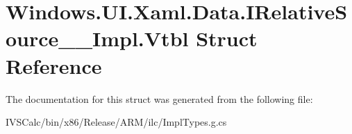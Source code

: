 \hypertarget{struct_windows_1_1_u_i_1_1_xaml_1_1_data_1_1_i_relative_source_____impl_1_1_vtbl}{}\section{Windows.\+U\+I.\+Xaml.\+Data.\+I\+Relative\+Source\+\_\+\+\_\+\+Impl.\+Vtbl Struct Reference}
\label{struct_windows_1_1_u_i_1_1_xaml_1_1_data_1_1_i_relative_source_____impl_1_1_vtbl}


The documentation for this struct was generated from the following file\+:\begin{DoxyCompactItemize}
\item 
I\+V\+S\+Calc/bin/x86/\+Release/\+A\+R\+M/ilc/Impl\+Types.\+g.\+cs\end{DoxyCompactItemize}
